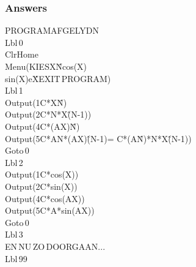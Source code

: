\begin{frame}
\frametitle{Answers}

\begin{ticalc}[6cm]
	PROGRAM\:AFGELYDN\\%
	\:Lbl\,0\\%
	\:ClrHome\\%
	\:Menu(\qt KIES\:\qt\comma \qt X\^N\qt{}\comma \qt cos(X)\\%
		\qt{}\comma \qt sin(X)\qt{}\comma \qt e\^X\qt{}\comma \qt EXIT\,PROGRAM\qt{})\\%
	\:Lbl\,1\\%
	\:Output(1\comma\qt C*X\^N\:\qt)\\%
	\:Output(2\comma\qt C*N*X\^(N-1)\qt)\\%
	\:Output(4\comma\qt C*(AX)\^N\:\qt)\\%
	\:Output(5\comma\qt C*AN*(AX)\^(N-1)= C*(A\^N)*N*X\^(N-1)\qt)\\%
	\:Goto\,0\\%
	\:Lbl\,2\\%
	\:Output(1\comma\qt C*cos(X)\:\qt)\\%
	\:Output(2\comma\qt C*sin(X)\qt)\\%
	\:Output(4\comma\qt C*cos(AX)\:\qt)\\%
	\:Output(5\comma\qt C*A*sin(AX)\qt)\\%
	\:Goto\,0\\%
	\:Lbl\,3\\%
	\:\qt EN\,NU\,ZO\,DOORGAAN...\\%
	\:Lbl\,99
\end{ticalc}

\end{frame}


